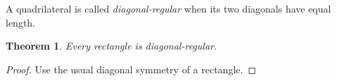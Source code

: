 \documentclass{article}
\newtheorem{theorem}{Theorem}
\begin{document}
A quadrilateral is called \emph{diagonal-regular} when its two diagonals have equal length.

\begin{theorem}\label{thm:main}
Every rectangle is diagonal-regular.
\end{theorem}
\begin{proof}
Use the usual diagonal symmetry of a rectangle.
\end{proof}
\end{document}
